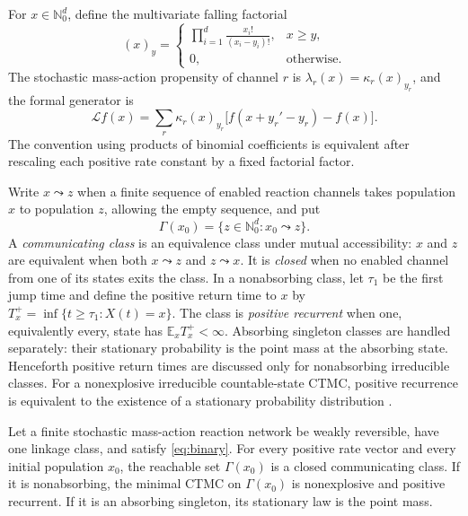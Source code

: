 For \(x\in\mathbb N_0^d\), define the multivariate falling factorial
\begin{equation}\label{eq:falling}
  (x)_y=
  \begin{cases}
  \displaystyle\prod_{i=1}^d\frac{x_i!}{(x_i-y_i)!},&x\ge y,\\[1ex]
  0,&\text{otherwise}.
  \end{cases}
\end{equation}
The stochastic mass-action propensity of channel \(r\) is
\(\lambda_r(x)=\kappa_r(x)_{y_r}\), and the formal generator is
\begin{equation}\label{eq:generator}
  \mathcal Lf(x)=\sum_r\kappa_r(x)_{y_r}
  \bigl[f(x+y_r'-y_r)-f(x)\bigr].
\end{equation}
The convention using products of binomial coefficients is equivalent after
rescaling each positive rate constant by a fixed factorial factor.

Write \(x\leadsto z\) when a finite sequence of enabled reaction channels
takes population \(x\) to population \(z\), allowing the empty sequence, and
put
\[
  \Gamma(x_0)=\{z\in\mathbb N_0^d:x_0\leadsto z\}.
\]
A \emph{communicating class} is an equivalence class under mutual
accessibility: \(x\) and \(z\) are equivalent when both \(x\leadsto z\) and
\(z\leadsto x\).  It is \emph{closed} when no enabled channel from one of its
states exits the class.  In a nonabsorbing class, let \(\tau_1\) be the first
jump time and define the positive return time to \(x\) by
\(T_x^+=\inf\{t\ge \tau_1:X(t)=x\}\).  The class is \emph{positive recurrent}
when one, equivalently every, state has \(\mathbb E_xT_x^+<\infty\).
Absorbing singleton classes are handled separately: their stationary
probability is the point mass at the absorbing state.  Henceforth positive
return times are discussed only for nonabsorbing irreducible classes.  For a
nonexplosive irreducible countable-state CTMC, positive recurrence is
equivalent to the existence of a stationary probability distribution
\citep{Norris1997}.

\begin{theorem}\label{thm:main}
Let a finite stochastic mass-action reaction network be weakly reversible,
have one linkage class, and satisfy \eqref{eq:binary}.  For every positive rate
vector and every initial population \(x_0\), the reachable set
\(\Gamma(x_0)\) is a closed communicating class.  If it is nonabsorbing, the
minimal CTMC on \(\Gamma(x_0)\) is nonexplosive and positive recurrent.  If it
is an absorbing singleton, its stationary law is the point mass.
\end{theorem}


